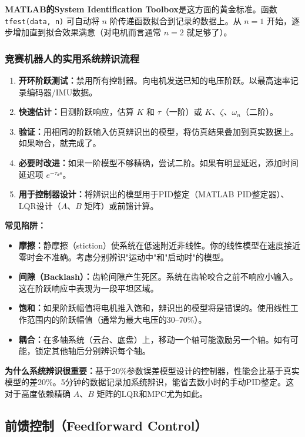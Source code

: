 \textbf{MATLAB的System Identification Toolbox}是这方面的黄金标准。函数 \texttt{tfest(data, n)} 可自动将 $n$ 阶传递函数拟合到记录的数据上。从 $n = 1$ 开始，逐步增加直到拟合效果满意（对电机而言通常 $n = 2$ 就足够了）。

\subsubsection{竞赛机器人的实用系统辨识流程}

\begin{enumerate}
    \item \textbf{开环阶跃测试：}禁用所有控制器。向电机发送已知的电压阶跃。以最高速率记录编码器/IMU数据。
    \item \textbf{快速估计：}目测阶跃响应，估算 $K$ 和 $\tau$（一阶）或 $K$、$\zeta$、$\omega_n$（二阶）。
    \item \textbf{验证：}用相同的阶跃输入仿真辨识出的模型，将仿真结果叠加到真实数据上。如果吻合，就完成了。
    \item \textbf{必要时改进：}如果一阶模型不够精确，尝试二阶。如果有明显延迟，添加时间延迟项 $e^{-\tau_d s}$。
    \item \textbf{用于控制器设计：}将辨识出的模型用于PID整定（MATLAB PID整定器）、LQR设计（$A$、$B$ 矩阵）或前馈计算。
\end{enumerate}

\textbf{常见陷阱：}
\begin{itemize}
    \item \textbf{摩擦：}静摩擦（stiction）使系统在低速附近非线性。你的线性模型在速度接近零时会不准确。考虑分别辨识"运动中"和"启动时"的模型。
    \item \textbf{间隙（Backlash）：}齿轮间隙产生死区。系统在齿轮咬合之前不响应小输入。这在阶跃响应中表现为一段平坦区域。
    \item \textbf{饱和：}如果阶跃幅值将电机推入饱和，辨识出的模型将是错误的。使用线性工作范围内的阶跃幅值（通常为最大电压的30--70\%）。
    \item \textbf{耦合：}在多轴系统（云台、底盘）上，移动一个轴可能激励另一个轴。如有可能，锁定其他轴后分别辨识每个轴。
\end{itemize}

\textbf{为什么系统辨识很重要：}基于20\%参数误差模型设计的控制器，性能会比基于真实模型的差20\%。5分钟的数据记录加系统辨识，能省去数小时的手动PID整定。这对于高度依赖精确 $A$、$B$ 矩阵的LQR和MPC尤为如此。

\subsection{前馈控制（Feedforward Control）}


